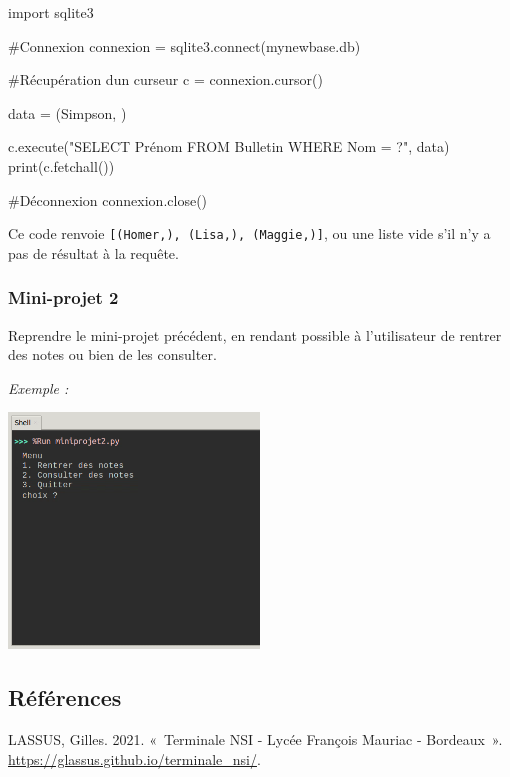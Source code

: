 \documentclass[
  letterpaper,
  DIV=11,
  numbers=noendperiod]{scrartcl}
\newenvironment{Shaded}{\begin{snugshade}}{\end{snugshade}}
\newcommand{\BuiltInTok}[1]{\textcolor[rgb]{0.00,0.23,0.31}{#1}}
\newcommand{\CommentTok}[1]{\textcolor[rgb]{0.37,0.37,0.37}{#1}}
\newcommand{\ExtensionTok}[1]{\textcolor[rgb]{0.00,0.23,0.31}{#1}}
\newcommand{\ImportTok}[1]{\textcolor[rgb]{0.00,0.46,0.62}{#1}}
\newcommand{\NormalTok}[1]{\textcolor[rgb]{0.00,0.23,0.31}{#1}}
\newcommand{\OperatorTok}[1]{\textcolor[rgb]{0.37,0.37,0.37}{#1}}
\newcommand{\StringTok}[1]{\textcolor[rgb]{0.13,0.47,0.30}{#1}}
\newlength{\cslhangindent}
\newlength{\cslentryspacingunit} %
\newenvironment{CSLReferences}[2] %
 {%
  \setlength{\parindent}{0pt}
  \ifodd #1
  \let\oldpar\par
  \def\par{\hangindent=\cslhangindent\oldpar}
  \fi
  \setlength{\parskip}{#2\cslentryspacingunit}
 }%
 {}
\begin{document}
\begin{Shaded}
\begin{Highlighting}[]
\ImportTok{import}\NormalTok{ sqlite3}

\CommentTok{\#Connexion}
\NormalTok{connexion }\OperatorTok{=}\NormalTok{ sqlite3.}\ExtensionTok{connect}\NormalTok{(}\StringTok{\textquotesingle{}mynewbase.db\textquotesingle{}}\NormalTok{)}

\CommentTok{\#Récupération d\textquotesingle{}un curseur}
\NormalTok{c }\OperatorTok{=}\NormalTok{ connexion.cursor()}

\NormalTok{data }\OperatorTok{=}\NormalTok{ (}\StringTok{\textquotesingle{}Simpson\textquotesingle{}}\NormalTok{, )}

\NormalTok{c.execute(}\StringTok{"SELECT Prénom FROM Bulletin WHERE Nom = ?"}\NormalTok{, data)}
\BuiltInTok{print}\NormalTok{(c.fetchall())  }


\CommentTok{\#Déconnexion}
\NormalTok{connexion.close()}
\end{Highlighting}
\end{Shaded}

Ce code renvoie
\texttt{{[}(\textquotesingle{}Homer\textquotesingle{},),\ (\textquotesingle{}Lisa\textquotesingle{},),\ (\textquotesingle{}Maggie\textquotesingle{},){]}},
ou une liste vide s'il n'y a pas de résultat à la requête.

\hypertarget{mini-projet-2}{%
\subsubsection{Mini-projet 2}\label{mini-projet-2}}

Reprendre le mini-projet précédent, en rendant possible à l'utilisateur
de rentrer des notes ou bien de les consulter.

\emph{Exemple :}

\includegraphics[width=0.5\textwidth]{TP3_1-0.png}

\hypertarget{ruxe9fuxe9rences}{%
\subsection*{Références}\label{ruxe9fuxe9rences}}

\hypertarget{refs}{}
\begin{CSLReferences}{1}{0}
\leavevmode{}%
LASSUS, Gilles. 2021. {«~Terminale NSI - Lycée François Mauriac -
Bordeaux~»}. \url{https://glassus.github.io/terminale_nsi/}.

\end{CSLReferences}
\end{document}
